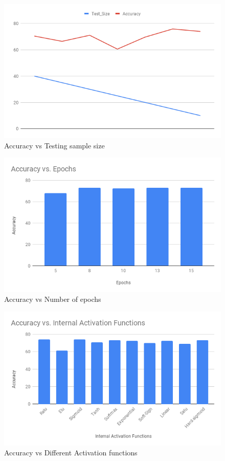 \documentclass[a4paper,11pt]{article}
\begin{document}
\begin{figure}[!hb]
\includegraphics[width=\linewidth]{1.png}
\caption{Accuracy vs Testing sample size}
\end{figure}

\begin{figure}
\includegraphics[width=\linewidth]{x3.png}
\caption{Accuracy vs Number of epochs}
\end{figure}


\begin{figure}
\includegraphics[width=\linewidth]{x4.png}
\caption{Accuracy vs Different Activation functions}
\end{figure}
\end{document}
